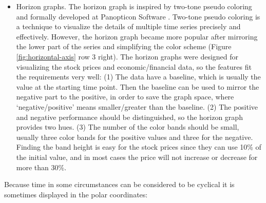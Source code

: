 \documentclass[12pt]{article}
\begin{document}
\begin{itemize}
\item Horizon graphs. The horizon graph is inspired by two-tone pseudo coloring
\citep{saito2005two} and formally developed at Panopticon Software
\citep{reijner2008development}. Two-tone pseudo coloring is a technique
to visualize the details of multiple time series precisely and effectively.
However, the horizon graph became more popular after mirroring the
lower part of the series and simplifying the color scheme (Figure \ref{fig:horizontal-axis} row 3 right). The horizon
graphs were designed for visualizing the stock prices and economic/financial
data, so the features fit the requirements very well:  (1) The data
have a baseline, which is usually the value at the starting time point.
Then the baseline can be used to mirror the negative part to the positive,
in order to save the graph space, where `negative/positive' means
smaller/greater than the baseline.  (2) The positive and negative performance
should be distinguished, so the horizon graph provides two hues.  (3)
The number of the color bands should be small, usually three color
bands for the positive values and three for the negative. Finding
the band height is easy for the stock prices since they can use 10\%
of the initial value, and in most cases the price will not increase
or decrease for more than 30\%.

\end{itemize}

%
%

Because time in some circumstances can be considered to be cyclical it is sometimes displayed in the polar coordinates:
\end{document}
